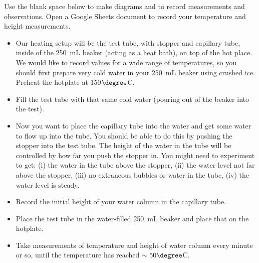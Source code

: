  Use the blank space below to make diagrams and to record measurements and observations. Open a Google Sheets document to record your temperature and height measurements.
	\begin{itemize}
	\item Our heating setup will be the test tube, with stopper and capillary tube, inside of the 250~mL beaker (acting as a heat bath), on top of the hot place.  We would like to record values for a wide range of temperatures, so you should first prepare very cold water in your 250~mL beaker using crushed ice. Preheat the hotplate at 150$\degree$C.
	\item Fill the test tube with that same cold water (pouring out of the beaker into the test).  
	\item Now you want to place the capillary tube into the water and get some water to flow up into the tube.  You should be able to do this by pushing the stopper into the test tube. The height of the water in the tube will be controlled by how far you push the stopper in.  You might need to experiment to get: (i) the water in the tube above the stopper, (ii) the water level not far above the stopper,  (iii) no extraneous bubbles or water in the tube, (iv) the water level is steady.
	\item Record the initial height of your water column in the capillary tube.
	\item Place the test tube in the water-filled 250~mL beaker and place that on the hotplate.  
	\item Take measurements of temperature and height of water column every minute or so, until the temperature has reached $\sim50\degree$C.
	\end{itemize}

\vspace{10cm}



